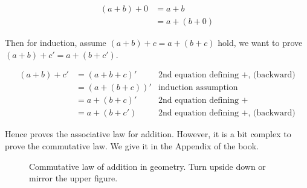 \documentclass[b5paper]{article}
\begin{document}
\[
\begin{array}{rl}
(a + b) + 0 & = a + b \\
            & = a + (b + 0)
\end{array}
\]

Then for induction, assume $(a + b) + c = a + (b + c)$ hold, we want to prove $(a + b) + c' = a + (b + c')$.

\[
\begin{array}{rlr}
(a + b) + c' & = (a + b + c)' & \text{2nd equation defining +, (backward)} \\
             & = (a + (b + c))' & \text{induction assumption} \\
             & = a + (b + c)' & \text{2nd equation defining +} \\
             & = a + (b + c') & \text{2nd equation defining +, (backward)}
\end{array}
\]

Hence proves the associative law for addition. However, it is a bit complex to prove the commutative law. We give it in the Appendix of the book.

\begin{figure}[htbp]
\centering
{}
\caption{Commutative law of addition in geometry. Turn upside down or mirror the upper figure.}
\end{figure}

\begin{Exercise}\label{ex:Peano-axiom}
\end{Exercise}
\end{document}
